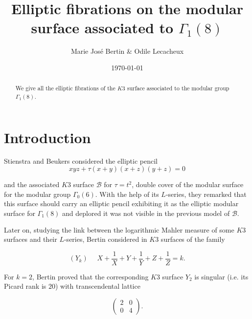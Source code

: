 \documentclass{amsart}
\title{Elliptic fibrations on the modular surface associated to $\Gamma_1(8)$}
\begin{document}
\author{Marie Jos\'e Bertin \& Odile Lecacheux}



\date{\today}









\begin{abstract} We give all the elliptic fibrations of the $K3$ surface associated to the modular group $\Gamma_1(8)$.
\end{abstract}

\maketitle






\section{Introduction}

Stienstra and Beukers \cite{SB} considered the elliptic pencil
$$xyz+\tau (x+y)(x+z)(y+z)=0$$

and the associated $K3$ surface $\mathcal B$ for $\tau =t^2$, double cover of the modular surface for the modular group $\Gamma_0(6)$. With the help of its $L$-series, they remarked that this surface should carry an elliptic pencil exhibiting it as the elliptic modular surface for $\Gamma_1(8)$ and deplored it was not visible in the previous model of $\mathcal B$.


Later on, studying the link between the logarithmic Mahler measure of some $K3$ surfaces and their $L$-series, Bertin considered in \cite{Ber} $K3$ surfaces of the family

$$(Y_k) \,\,\,\,\,\,\,\,X+\frac {1}{X}+Y+\frac {1}{Y}+Z+\frac {1}{Z}=k.$$
 
For $k=2$, Bertin proved that the corresponding $K3$ surface $Y_2$ is singular (i.e. its Picard rank is $20$) with transcendental lattice 

$$
\left (
\begin{matrix}
2 & 0 \\
0 & 4
\end{matrix}
\right ).
$$
\end{document}
